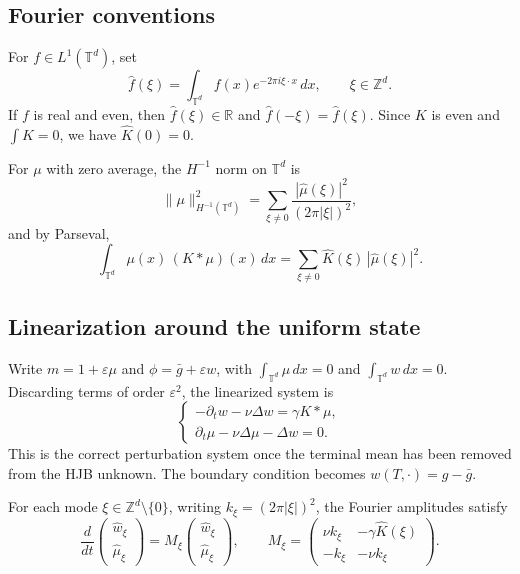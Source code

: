 \documentclass[11pt]{amsart}
\theoremstyle{definition}
\theoremstyle{remark}
\newcommand{\Td}{\mathbb{T}^d}
\newcommand{\Zd}{\mathbb{Z}^d}
\newcommand{\R}{\mathbb{R}}
\newcommand{\Kh}{\widehat{K}}
\newcommand{\eps}{\varepsilon}
\begin{document}
\subsection{Fourier conventions}
\label{sub:fourier}

For $f\in L^1(\Td)$, set
\[
\widehat f(\xi)=\int_{\Td} f(x)e^{-2\pi i\xi\cdot x}\,dx,
\qquad \xi\in\Zd.
\]
If $f$ is real and even, then $\widehat f(\xi)\in\R$ and $\widehat f(-\xi)=\widehat f(\xi)$. Since $K$ is even and $\int K=0$, we have $\Kh(0)=0$.

For $\mu$ with zero average, the $H^{-1}$ norm on $\Td$ is
\[
\|\mu\|_{H^{-1}(\Td)}^2
=
\sum_{\xi\neq 0}\frac{|\widehat{\mu}(\xi)|^2}{(2\pi|\xi|)^2},
\]
and by Parseval,
\[
\int_{\Td}\mu(x)\,(K*\mu)(x)\,dx
=
\sum_{\xi\neq 0}\Kh(\xi)\,|\widehat{\mu}(\xi)|^2.
\]

\subsection{Linearization around the uniform state}
\label{sub:linearization}

Write $m=1+\eps\mu$ and $\phi=\bar g+\eps w$, with $\int_{\Td}\mu\,dx=0$ and $\int_{\Td}w\,dx=0$. Discarding terms of order $\eps^2$, the linearized system is
\begin{equation}
\label{eq:lin-system}
\begin{cases}
-\partial_t w-\nu\Delta w=\gamma K*\mu,\\[3pt]
\partial_t \mu-\nu\Delta\mu-\Delta w=0.
\end{cases}
\end{equation}
This is the correct perturbation system once the terminal mean has been removed from the HJB unknown. The boundary condition becomes $w(T,\cdot)=g-\bar g$.

For each mode $\xi\in\Zd\setminus\{0\}$, writing $k_\xi=(2\pi|\xi|)^2$, the Fourier amplitudes satisfy
\begin{equation}
\label{eq:fourier-ode}
\frac{d}{dt}
\begin{pmatrix}
\widehat{w}_\xi\\
\widehat{\mu}_\xi
\end{pmatrix}
=
M_\xi
\begin{pmatrix}
\widehat{w}_\xi\\
\widehat{\mu}_\xi
\end{pmatrix},
\qquad
M_\xi=
\begin{pmatrix}
\nu k_\xi & -\gamma\Kh(\xi)\\[2pt]
-k_\xi & -\nu k_\xi
\end{pmatrix}.
\end{equation}
\end{document}
